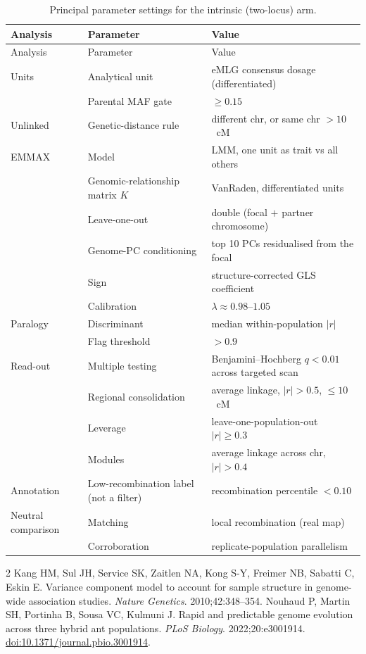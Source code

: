 \documentclass[11pt]{article}
\begin{document}
\begin{longtable}{>{\raggedright\arraybackslash}p{}
                  >{\raggedright\arraybackslash}p{}
                  >{\raggedright\arraybackslash}p{}}
\caption{Principal parameter settings for the intrinsic (two-locus) arm.}
\label{tabD:parameters}\\
\toprule
Analysis & Parameter & Value \\
\midrule
\endfirsthead
\toprule
Analysis & Parameter & Value \\
\midrule
\endhead
Units & Analytical unit & eMLG consensus dosage (differentiated) \\
      & Parental MAF gate & $\geq0.15$ \\
\midrule
Unlinked & Genetic-distance rule & different chr, or same chr $>10$~cM \\
\midrule
EMMAX & Model & LMM, one unit as trait vs all others \\
      & Genomic-relationship matrix $K$ & VanRaden, differentiated units \\
      & Leave-one-out & double (focal $+$ partner chromosome) \\
      & Genome-PC conditioning & top 10 PCs residualised from the focal \\
      & Sign & structure-corrected GLS coefficient \\
      & Calibration & $\lambda\approx0.98$--$1.05$ \\
\midrule
Paralogy & Discriminant & median within-population $|r|$ \\
         & Flag threshold & $>0.9$ \\
\midrule
Read-out & Multiple testing & Benjamini--Hochberg $q<0.01$ across targeted scan \\
         & Regional consolidation & average linkage, $|r|>0.5$, $\leq10$~cM \\
         & Leverage & leave-one-population-out $|r|\geq0.3$ \\
         & Modules & average linkage across chr, $|r|>0.4$ \\
\midrule
Annotation & Low-recombination label (not a filter) & recombination percentile $<0.10$ \\
\midrule
Neutral comparison & Matching & local recombination (real map) \\
                & Corroboration & replicate-population parallelism \\
\bottomrule
\end{longtable}

\begin{thebibliography}{2}
Kang HM, Sul JH, Service SK, Zaitlen NA, Kong S-Y, Freimer NB, Sabatti C, Eskin E.
Variance component model to account for sample structure in genome-wide association studies.
\textit{Nature Genetics}. 2010;42:348--354.
Nouhaud P, Martin SH, Portinha B, Sousa VC, Kulmuni J. Rapid and predictable genome evolution
across three hybrid ant populations. \textit{PLoS Biology}. 2022;20:e3001914.
\href{https://doi.org/10.1371/journal.pbio.3001914}{doi:10.1371/journal.pbio.3001914}.
\end{thebibliography}
\end{document}
